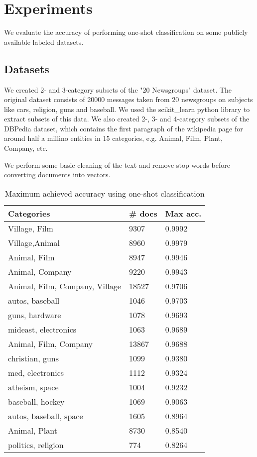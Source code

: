\section{Experiments}
We evaluate the accuracy of performing one-shot classification on some publicly available labeled datasets.

\subsection{Datasets}
We created 2- and 3-category subsets of the "20 Newsgroups" dataset. The original dataset consists of 20000 messages taken from 20 newsgroups on subjects like cars, religion, guns and baseball. We used the scikit\_learn python library to extract subsets of this data. We also created 2-, 3- and 4-category subsets of the DBPedia dataset, which contains the first paragraph of the wikipedia page for around half a millino entities in 15 categories, e.g. Animal, Film, Plant, Company, etc.

We perform some basic cleaning of the text and remove stop words before converting documents into vectors.

\begin{table}[]
\centering
\captionsetup{position=bottom}
\begin{tabular}{lll}
\toprule
Categories                  & \# docs & Max acc. \\
\midrule
Village, Film                & 9307         & 0.9992       \\
Village,Animal              & 8960         & 0.9979       \\
Animal, Film                 & 8947         & 0.9946       \\
Animal, Company              & 9220         & 0.9943       \\
Animal, Film, Company, Village & 18527        & 0.9706       \\
autos, baseball              & 1046         & 0.9703       \\
guns, hardware               & 1078         & 0.9693       \\
mideast, electronics         & 1063         & 0.9689       \\
Animal, Film, Company         & 13867        & 0.9688       \\
christian, guns              & 1099         & 0.9380       \\
med, electronics             & 1112         & 0.9324       \\
atheism, space               & 1004         & 0.9232       \\
baseball, hockey             & 1069         & 0.9063       \\
autos, baseball, space        & 1605         & 0.8964       \\
Animal, Plant                & 8730         & 0.8540       \\
politics, religion           & 774          & 0.8264      \\
\bottomrule
\end{tabular}
\caption{Maximum achieved accuracy using one-shot classification}\label{bruteforce}
\end{table}

